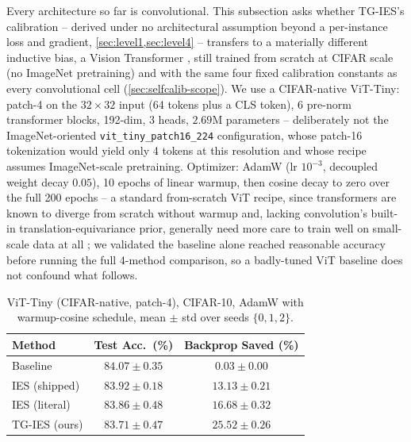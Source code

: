 \documentclass{article}
\newcommand{\win}[1]{\cellcolor{tgwin}#1}
\newcommand{\lose}[1]{\cellcolor{tglose}#1}
\theoremstyle{plain}
\theoremstyle{definition}
\theoremstyle{remark}
\begin{document}
Every architecture so far is convolutional. This subsection asks whether TG-IES's calibration -- derived under no architectural assumption beyond a per-instance loss and gradient, \cref{sec:level1,sec:level4} -- transfers to a materially different inductive bias, a Vision Transformer \citep{dosovitskiy2021image}, still trained from scratch at CIFAR scale (no ImageNet pretraining) and with the same four fixed calibration constants as every convolutional cell (\cref{sec:selfcalib-scope}). We use a CIFAR-native ViT-Tiny: patch-4 on the $32{\times}32$ input (64 tokens plus a CLS token), 6 pre-norm transformer blocks, 192-dim, 3 heads, $2.69$M parameters -- deliberately not the ImageNet-oriented \texttt{vit\_tiny\_patch16\_224} configuration, whose patch-16 tokenization would yield only 4 tokens at this resolution and whose recipe assumes ImageNet-scale pretraining. Optimizer: AdamW (lr $10^{-3}$, decoupled weight decay $0.05$), 10 epochs of linear warmup, then cosine decay to zero over the full 200 epochs -- a standard from-scratch ViT recipe, since transformers are known to diverge from scratch without warmup and, lacking convolution's built-in translation-equivariance prior, generally need more care to train well on small-scale data at all \citep{gani2022train}; we validated the baseline alone reached reasonable accuracy before running the full 4-method comparison, so a badly-tuned ViT baseline does not confound what follows.

\begin{table}[h]
\caption{ViT-Tiny (CIFAR-native, patch-4), CIFAR-10, AdamW with warmup-cosine schedule, mean $\pm$ std over seeds $\{0,1,2\}$.}
\label{tab:vit10}
\vskip 0.1in
\begin{center}
\begin{small}
\begin{tabular}{lcc}
\toprule
Method & Test Acc.\ (\%) & Backprop Saved (\%) \\
\midrule
Baseline & $84.07\pm0.35$ & $0.03\pm0.00$ \\
IES (shipped) & $83.92\pm0.18$ & $13.13\pm0.21$ \\
IES (literal) & $83.86\pm0.48$ & $16.68\pm0.32$ \\
\win{TG-IES (ours)} & \lose{$83.71\pm0.47$} & \win{$\mathbf{25.52\pm0.26}$} \\
\bottomrule
\end{tabular}
\end{small}
\end{center}
\vskip -0.1in
\end{table}
\end{document}
